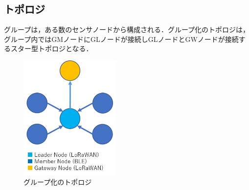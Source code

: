\subsection{トポロジ}
グループは，ある数のセンサノードから構成される．グループ化のトポロジは，グループ内ではGMノードにGLノードが接続しGLノードとGWノードが接続するスター型トポロジとなる．

\begin{figure}[]
    \begin{center}
    \includegraphics[width=5cm]{figures/グループ化のトポロジ.png}
    \caption{グループ化のトポロジ}
    \label{fig:group_topology}
    \end{center}
\end{figure}